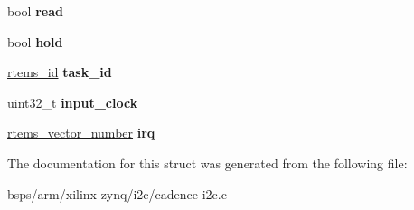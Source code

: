 \begin{DoxyCompactItemize}
\mbox{\label{structcadence__i2c__bus_a7a30a5c661f6afd6925cd5199b1e8d71}} 
bool {\bfseries read}
\item 
\mbox{\label{structcadence__i2c__bus_ad7f00b0cf31b63d22433eb6ba3f6b112}} 
bool {\bfseries hold}
\item 
\mbox{\label{structcadence__i2c__bus_ac991745f7a5748a436654f5753cd0d0d}} 
\mbox{\hyperlink{group__ClassicTasks_gab20892b814dced7dd4e5b9bf42becd57}{rtems\+\_\+id}} {\bfseries task\+\_\+id}
\item 
\mbox{\label{structcadence__i2c__bus_af14f15807bc9a45bd4d220912a2f5ead}} 
uint32\+\_\+t {\bfseries input\+\_\+clock}
\item 
\mbox{\label{structcadence__i2c__bus_af10d21170fc17ad9868e4ec9f43cc59c}} 
\mbox{\hyperlink{group__ClassicINTR_ga3e434c197d99f128e78cae4d9358bd8b}{rtems\+\_\+vector\+\_\+number}} {\bfseries irq}
\end{DoxyCompactItemize}


The documentation for this struct was generated from the following file\+:\begin{DoxyCompactItemize}
\item 
bsps/arm/xilinx-\/zynq/i2c/cadence-\/i2c.\+c\end{DoxyCompactItemize}
